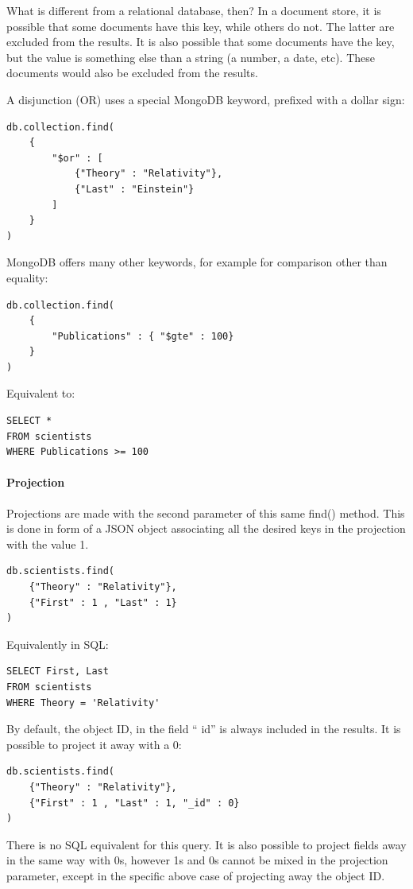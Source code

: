 What is different from a relational database, then? In a document store, it is possible that some documents have this key, while others do not. The latter are excluded from the results. It is also possible that some documents have the key, but the value is something else than a string (a number, a date, etc). These documents would also be excluded from the results.

A disjunction (OR) uses a special MongoDB keyword, prefixed with a dollar sign:
\begin{lstlisting}[style=neutral]
db.collection.find(
    {
        "$or" : [
            {"Theory" : "Relativity"},
            {"Last" : "Einstein"}
        ]
    }
)
\end{lstlisting}

MongoDB offers many other keywords, for example for comparison other than equality:

\begin{lstlisting}[style=neutral]
db.collection.find(
    {
        "Publications" : { "$gte" : 100}
    }
)
\end{lstlisting}
Equivalent to:
\begin{lstlisting}[style=neutral]
SELECT *
FROM scientists
WHERE Publications >= 100
\end{lstlisting}


\paragraph{Projection}
Projections are made with the second parameter of this same find() method. This is done in form of a JSON object associating all the desired keys in the projection with the value 1.

\begin{lstlisting}[style=neutral]
db.scientists.find(
    {"Theory" : "Relativity"},
    {"First" : 1 , "Last" : 1}
)
\end{lstlisting}

Equivalently in SQL:
\begin{lstlisting}[style=neutral]
SELECT First, Last
FROM scientists
WHERE Theory = 'Relativity'
\end{lstlisting}

By default, the object ID, in the field “ id” is always included in the results. It is possible to project it away with a 0:
\begin{lstlisting}[style=neutral]
db.scientists.find(
    {"Theory" : "Relativity"},
    {"First" : 1 , "Last" : 1, "_id" : 0}
)
\end{lstlisting}
There is no SQL equivalent for this query. It is also possible to project fields away in the same way with 0s, however 1s and 0s cannot be mixed in the projection parameter, except in the specific above case of projecting away the object ID.

